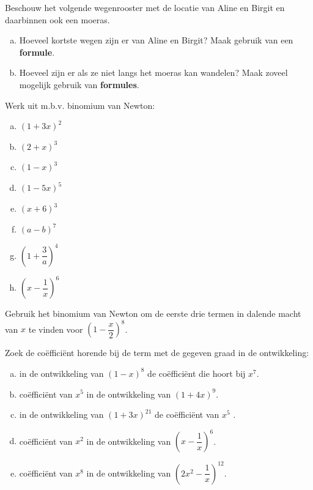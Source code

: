 \documentclass[12pt,a4paper,twoside]{article}
\begin{document}
\begin{oefening}
Beschouw het volgende wegenrooster met de locatie van Aline en Birgit en daarbinnen ook een moeras.
\begin{center}
\end{center}
\begin{enumerate}[(a)]
\item Hoeveel kortste wegen zijn er van Aline en Birgit? Maak gebruik van een {\bf formule}.
\item Hoeveel zijn er als ze niet langs het moeras kan wandelen? Maak zoveel mogelijk gebruik van {\bf formules}.
\end{enumerate}
\end{oefening}

\begin{oefening}
Werk uit m.b.v. binomium van Newton:
\begin{multicols}{3}
\begin{enumerate}[(a)]
  \item $\left(1+3x\right)^2$
  \item $\left(2+x\right)^3$
  \item $\left(1-x\right)^3$
  \item $\left(1-5x\right)^5$
  \item $\left(x+6\right)^3$
  \item $\left(a-b\right)^7$
  \item $\left(1+\dfrac{3}{a}\right)^4$
  \item $\left(x-\dfrac{1}{x}\right)^6$
\end{enumerate}
\end{multicols}
\end{oefening}

\begin{oefening}
Gebruik het binomium van Newton om de eerste drie termen in dalende macht van $x$ te vinden voor $\left(1-\dfrac{x}{2}\right)^8$.
\end{oefening}

\begin{oefening}
Zoek de coëfficiënt horende bij de term met de gegeven graad in de ontwikkeling:
\begin{enumerate}[(a)]
  \item in de ontwikkeling van $\left(1-x\right)^8$ de coëfficiënt die hoort bij $x^7$.
  \item coëfficiënt van $x^5$ in de ontwikkeling van $\left(1+4x\right)^9$.
  \item in de ontwikkeling van $\left(1+3x\right)^{21}$ de coëfficiënt van $x^5$ .
  \item coëfficiënt van $x^2$ in de ontwikkeling van $\left(x-\dfrac{1}{x}\right)^6$.
  \item coëfficiënt van $x^8$ in de ontwikkeling van $\left(2x^2-\dfrac{1}{x}\right)^{12}$.
\end{enumerate}
\end{oefening}
\end{document}
